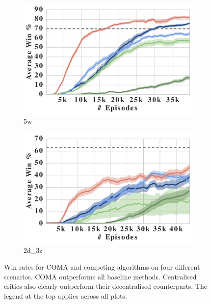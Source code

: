 \documentclass[letterpaper]{article}
\begin{document}
\begin{figure}[t!]
\begin{subfigure}[b]{0.4\linewidth}
	\includegraphics[width=\textwidth]{shared/5w_ef}
	\caption{5w}
	\end{subfigure}
 	\begin{subfigure}[b]{0.4\linewidth}
%	
	\includegraphics[width=\textwidth]{shared/2d_3z_ef}
	\caption{2d\_3z}

	\end{subfigure}
 	\caption{Win rates for COMA and competing algorithms on four different 
 		scenarios. COMA outperforms all baseline methods. Centralised critics 
 		also
 		clearly outperform their decentralised counterparts. The legend at the 
 		top applies across all plots.}
 	\label{fig:fig_2}
    \vspace{-0.75em}
 \end{figure}
\end{document}
